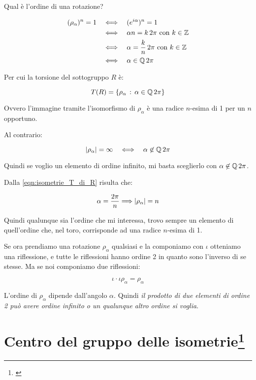 Qual è l'ordine di una rotazione?

\begin{align}
	(\rho_\alpha)^n = 1 & \quad\Longleftrightarrow\quad (e^{i\alpha})^n = 1 \\
	& \quad\Longleftrightarrow\quad \alpha n = k\, 2 \pi \text{ con } k \in \mathbb{Z} \\
	& \quad\Longleftrightarrow\quad \alpha = \dfrac{k}{n}\,2\pi \text{ con } k \in \mathbb{Z} \\
	& \quad\Longleftrightarrow\quad \alpha \in \mathbb{Q} \, 2\pi
\end{align}

Per cui la torsione del sottogruppo $R$ è:

\begin{equation}
	\label{eqn:isometrie_T_di_R}
	T(R) = \{\rho_\alpha \,:\, \alpha \in \mathbb{Q}\,2\pi\}
\end{equation}

Ovvero l'immagine tramite l'isomorfismo di $\rho_\alpha$ è una radice $n$-esima di 1 per un $n$ opportuno.

Al contrario:

\begin{equation}
	\lvert \rho_\alpha \rvert = \infty \quad\Longleftrightarrow\quad \alpha \not\in \mathbb{Q}\,2\pi
\end{equation}

Quindi se voglio un elemento di ordine infinito, mi basta sceglierlo con $\alpha \not\in \mathbb{Q}\,2\pi$.

Dalla \eqref{eqn:isometrie_T_di_R} risulta che:

\begin{equation}
	\alpha = \dfrac{2\pi}{n} \Longrightarrow \lvert \rho_\alpha \rvert = n
\end{equation}

Quindi qualunque sia l'ordine che mi interessa, trovo sempre un elemento di quell'ordine che, nel toro, corrisponde ad una radice $n$-esima di 1.

Se ora prendiamo una rotazione $\rho_\alpha$ qualsiasi e la componiamo con $\iota$ otteniamo una riflessione, e tutte le riflessioni hanno ordine 2 in quanto sono l'inverso di se stesse. Ma se noi componiamo due riflessioni:

\begin{equation}
	\iota \cdot \iota\rho_\alpha = \rho_\alpha 
\end{equation}

L'ordine di $\rho_\alpha$ dipende dall'angolo $\alpha$. Quindi \emph{il prodotto di due elementi di ordine 2 può avere ordine infinito o un qualunque altro ordine si voglia}.

\section[Centro del gruppo delle isometrie]{Centro del gruppo delle isometrie\protect\footnote{\cite[7 novembre 2021]{lucchini}}}


